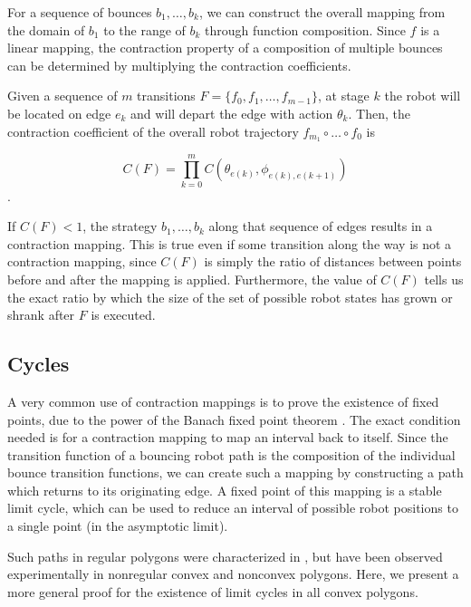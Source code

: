 \documentclass[]{styles/svproc}  %
\begin{document}
For a sequence of bounces $b_1, \ldots, b_k$, we can construct the overall
mapping from the domain of $b_1$ to the range of $b_k$ through function
composition. Since $f$ is a linear mapping, the contraction property of a composition 
of multiple bounces can be determined by multiplying the contraction
coefficients.

\begin{definition}
Given a sequence of $m$ transitions $F = \{f_0, f_1, \ldots, f_{m-1}\}$, at stage $k$ the robot 
will be located on edge $e_k$ and will depart the edge with
action $\theta_k$. Then, the contraction coefficient of the overall robot
trajectory $f_{m_1} \circ \ldots \circ f_0$ is

$$ C(F) = \prod_{k=0}^m C(\theta_{e(k)}, \phi_{e(k), e(k+1)}) $$.
\end{definition}

If $C(F) < 1$, the strategy $b_1, \ldots, b_k$ along that sequence of edges
results in a contraction mapping. This is true even if some transition along
the way is not a
contraction mapping, since $C(F)$ is simply the ratio of distances
between points before and after the mapping is applied. Furthermore, the value
of $C(F)$ tells us the exact ratio by which the
size of the set of possible robot states has grown or shrank after $F$ is
executed.


\subsection{Cycles} \label{sec:cycles}

A very common use of contraction mappings is to prove the existence of fixed
points, due to the power of the Banach fixed point theorem \cite{Granas2003}.
The exact condition needed is for a contraction mapping to map an interval back
to itself. Since the transition function of a bouncing robot path is the
composition of the individual bounce transition functions, we can create such a
mapping by constructing a path which returns to its originating edge. A fixed
point of this mapping is a stable limit cycle, which can be used to reduce an
interval of possible robot positions to a single point (in the asymptotic
limit).

Such paths
in regular polygons were characterized in \cite{NilBecLav17}, but have been
observed experimentally in nonregular convex and nonconvex polygons. Here, we
present a more general proof for the existence of limit cycles in all convex
polygons.
\end{document}
